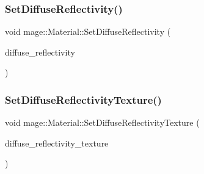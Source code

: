 \hypertarget{structmage_1_1_material_a83281d9408fcdc3c6de6804f31a527b3}{}\label{structmage_1_1_material_a83281d9408fcdc3c6de6804f31a527b3} 
\subsubsection{\texorpdfstring{Set\+Diffuse\+Reflectivity()}{SetDiffuseReflectivity()}\hspace{0.1cm}{\footnotesize\ttfamily [2/2]}}
{\footnotesize\ttfamily void mage\+::\+Material\+::\+Set\+Diffuse\+Reflectivity (\begin{DoxyParamCaption}\item[{\hyperlink{structmage_1_1_r_g_b_spectrum}{R\+G\+B\+Spectrum} \&\&}]{diffuse\+\_\+reflectivity }\end{DoxyParamCaption})\hspace{0.3cm}{\ttfamily [noexcept]}}

\hypertarget{structmage_1_1_material_a32e02c92dfd73db1a8a809a45546dc87}{}\label{structmage_1_1_material_a32e02c92dfd73db1a8a809a45546dc87} 
\subsubsection{\texorpdfstring{Set\+Diffuse\+Reflectivity\+Texture()}{SetDiffuseReflectivityTexture()}}
{\footnotesize\ttfamily void mage\+::\+Material\+::\+Set\+Diffuse\+Reflectivity\+Texture (\begin{DoxyParamCaption}\item[{\hyperlink{namespacemage_a1e01ae66713838a7a67d30e44c67703e}{Shared\+Ptr}$<$ \hyperlink{classmage_1_1_texture}{Texture} $>$}]{diffuse\+\_\+reflectivity\+\_\+texture }\end{DoxyParamCaption})}

\hypertarget{structmage_1_1_material_ab9c90afa999906a3ad33c8a8da13da24}{}\label{structmage_1_1_material_ab9c90afa999906a3ad33c8a8da13da24} 

